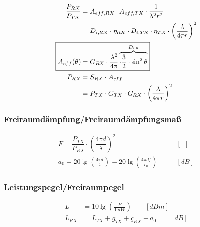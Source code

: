 \begin{align*}
    \frac{P_{RX}}{P_{TX}} & = A_{eff,RX}\cdot A_{eff,TX}\cdot\frac{1}{\lambda^2r^2}                                            \\
                          & = D_{i,RX}\cdot\eta_{RX}\cdot D_{i,TX}\cdot\eta_{TX}\cdot\left(\frac{\lambda}{4\pi r}\right)^2     \\
    \Aboxed{A_{eff}(\theta)   & = G_{RX}\cdot\frac{\lambda^2}{4\pi}\overbrace{\cdot\frac{3}{2}\cdot\sin^2\theta}^{{D_{i,\theta}}}} \\
    P_{RX}                & = S_{RX}\cdot A_{eff}                                                                                  \\
                          & = P_{TX}\cdot G_{TX}\cdot G_{RX}\cdot \left(\frac{\lambda}{4\pi r}\right)^2
\end{align*}

\subsubsection{Freiraumdämpfung/Freiraumdämpfungsmaß}
\begin{align*}
    F = \dfrac{P_{TX}}{P_{RX}} \cdot \left(\dfrac{4 \pi d}{\lambda}\right)^2                         & \qquad [1]       \\
    a_{0} = 20 \lg \left(\frac{4 \pi d}{\lambda}\right) =20 \lg \left(\frac{4 \pi d f}{c_{0}}\right) & \qquad [\si{dB}]
\end{align*}

\subsubsection{Leistungspegel/Freiraumpegel}
\begin{align*}
    L      & = 10 \lg \left(\frac{P}{1 \si{mW}}\right) \qquad [\si{dBm}] \\
    L_{RX} & = L_{TX}+g_{TX}+g_{RX}-a_{0} \qquad [\si{dB}]
\end{align*}
